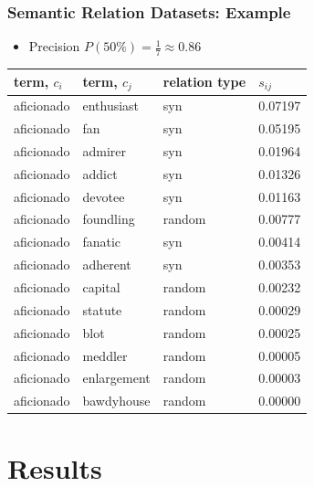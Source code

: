\documentclass{beamer}
\begin{document}
\begin{frame}
\frametitle{Semantic Relation Datasets: Example}

\begin{itemize}
	\item Precision $P(50\%)= \frac{1}{7} \approx 0.86 $
\end{itemize}


\begin{table}[h]\footnotesize
\begin{tabular}{ |l|l|l|l| }
\hline
 term, $c_i$ &  term, $c_j$ & relation type & \bf $s_{ij}$ \\ \hline \hline

aficionado & enthusiast & syn & 0.07197 \\
aficionado & fan & syn & 0.05195 \\
aficionado & admirer & syn & 0.01964 \\
aficionado & addict & syn & 0.01326 \\
aficionado & devotee & syn & 0.01163 \\
aficionado & foundling & random & 0.00777 \\
aficionado & fanatic & syn & 0.00414 \\ \hline
aficionado & adherent & syn & 0.00353 \\
aficionado & capital & random & 0.00232 \\
aficionado & statute & random & 0.00029 \\
aficionado & blot & random & 0.00025 \\
aficionado & meddler & random & 0.00005 \\
aficionado & enlargement & random &	0.00003 \\
aficionado & bawdyhouse & random & 	0.00000 \\ 
\hline
\end{tabular}
\end {table}

\end{frame}

\section{Results}
\subsection{}

\end{document}
